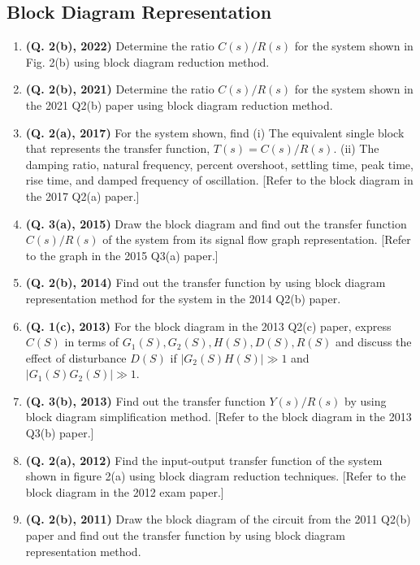 \documentclass[12pt, a4paper]{article}
\begin{document}
	\subsection{Block Diagram Representation}
	\begin{enumerate}
		\item \textbf{(Q. 2(b), 2022)} Determine the ratio $C(s)/R(s)$ for the system shown in Fig. 2(b) using block diagram reduction method.
		\item \textbf{(Q. 2(b), 2021)} Determine the ratio $C(s)/R(s)$ for the system shown in the 2021 Q2(b) paper using block diagram reduction method.
		\item \textbf{(Q. 2(a), 2017)} For the system shown, find (i) The equivalent single block that represents the transfer function, $T(s) = C(s)/R(s)$. (ii) The damping ratio, natural frequency, percent overshoot, settling time, peak time, rise time, and damped frequency of oscillation. [Refer to the block diagram in the 2017 Q2(a) paper.]
		\item \textbf{(Q. 3(a), 2015)} Draw the block diagram and find out the transfer function $C(s)/R(s)$ of the system from its signal flow graph representation. [Refer to the graph in the 2015 Q3(a) paper.]
		\item \textbf{(Q. 2(b), 2014)} Find out the transfer function by using block diagram representation method for the system in the 2014 Q2(b) paper.
		\item \textbf{(Q. 1(c), 2013)} For the block diagram in the 2013 Q2(c) paper, express $C(S)$ in terms of $G_1(S), G_2(S), H(S), D(S), R(S)$ and discuss the effect of disturbance $D(S)$ if $|G_2(S)H(S)| \gg 1$ and $|G_1(S)G_2(S)| \gg 1$.
		\item \textbf{(Q. 3(b), 2013)} Find out the transfer function $Y(s)/R(s)$ by using block diagram simplification method. [Refer to the block diagram in the 2013 Q3(b) paper.]
		\item \textbf{(Q. 2(a), 2012)} Find the input-output transfer function of the system shown in figure 2(a) using block diagram reduction techniques. [Refer to the block diagram in the 2012 exam paper.]
		\item \textbf{(Q. 2(b), 2011)} Draw the block diagram of the circuit from the 2011 Q2(b) paper and find out the transfer function by using block diagram representation method.
	\end{enumerate}
	
\end{document}
